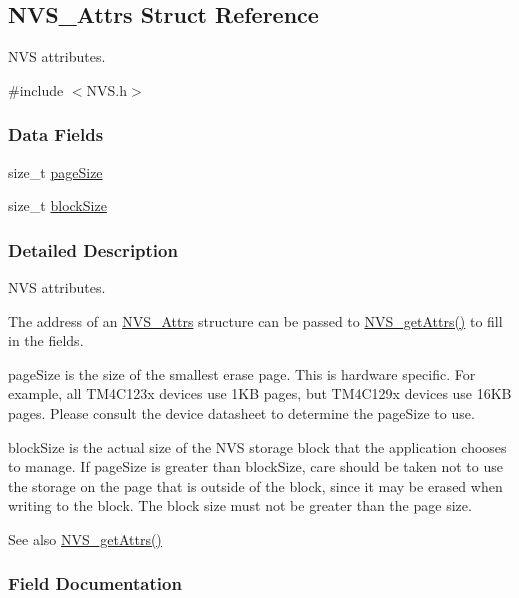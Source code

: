 \subsection{N\+V\+S\+\_\+\+Attrs Struct Reference}
\label{struct_n_v_s___attrs}


N\+V\+S attributes.  




{\ttfamily \#include $<$N\+V\+S.\+h$>$}

\subsubsection*{Data Fields}
\begin{DoxyCompactItemize}
\item 
size\+\_\+t \hyperlink{struct_n_v_s___attrs_a57112fee0ce3701ebee1b96b50638e8c}{page\+Size}
\item 
size\+\_\+t \hyperlink{struct_n_v_s___attrs_a2fd12e8a91495037a43bf409c0ae6435}{block\+Size}
\end{DoxyCompactItemize}


\subsubsection{Detailed Description}
N\+V\+S attributes. 

The address of an \hyperlink{struct_n_v_s___attrs}{N\+V\+S\+\_\+\+Attrs} structure can be passed to \hyperlink{_n_v_s_8h_a6b92f45097f377824524f7a4f33f02b1}{N\+V\+S\+\_\+get\+Attrs()} to fill in the fields.

page\+Size is the size of the smallest erase page. This is hardware specific. For example, all T\+M4\+C123x devices use 1\+K\+B pages, but T\+M4\+C129x devices use 16\+K\+B pages. Please consult the device datasheet to determine the page\+Size to use.

block\+Size is the actual size of the N\+V\+S storage block that the application chooses to manage. If page\+Size is greater than block\+Size, care should be taken not to use the storage on the page that is outside of the block, since it may be erased when writing to the block. The block size must not be greater than the page size.

\begin{DoxySeeAlso}{See also}
\hyperlink{_n_v_s_8h_a6b92f45097f377824524f7a4f33f02b1}{N\+V\+S\+\_\+get\+Attrs()} 
\end{DoxySeeAlso}


\subsubsection{Field Documentation}
